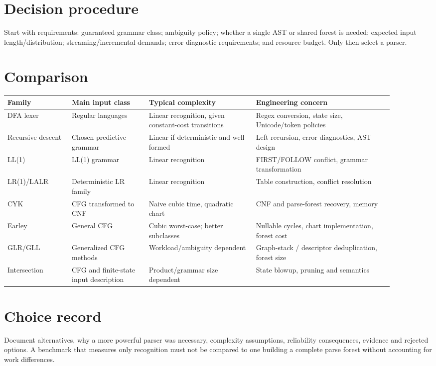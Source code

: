 \documentclass[11pt,letterpaper]{article}
\begin{document}
\makedoctitle\makedocsummary
\tableofcontents\clearpage

\section{Decision procedure}
Start with requirements: guaranteed grammar class; ambiguity policy; whether a single AST or shared forest is needed; expected input length/distribution; streaming/incremental demands; error diagnostic requirements; and resource budget. Only then select a parser.
\section{Comparison}\small\begin{longtable}{@{}>{\raggedright\arraybackslash}p{0.15\linewidth}>{\raggedright\arraybackslash}p{0.18\linewidth}>{\raggedright\arraybackslash}p{0.25\linewidth}>{\raggedright\arraybackslash}p{0.32\linewidth}@{}}\toprule Family & Main input class & Typical complexity & Engineering concern\\\midrule\endhead
DFA lexer & Regular languages & Linear recognition, given constant-cost transitions & Regex conversion, state size, Unicode/token policies\\
Recursive descent & Chosen predictive grammar & Linear if deterministic and well formed & Left recursion, error diagnostics, AST design\\
LL(1) & LL(1) grammar & Linear recognition & FIRST/FOLLOW conflict, grammar transformation\\
LR(1)/LALR & Deterministic LR family & Linear recognition & Table construction, conflict resolution\\
CYK & CFG transformed to CNF & Naive cubic time, quadratic chart & CNF and parse-forest recovery, memory\\
Earley & General CFG & Cubic worst-case; better subclasses & Nullable cycles, chart implementation, forest cost\\
GLR/GLL & Generalized CFG methods & Workload/ambiguity dependent & Graph-stack / descriptor deduplication, forest size\\
Intersection & CFG and finite-state input description & Product/grammar size dependent & State blowup, pruning and semantics\\
\bottomrule\end{longtable}\normalsize
\section{Choice record}
Document alternatives, why a more powerful parser was necessary, complexity assumptions, reliability consequences, evidence and rejected options. A benchmark that measures only recognition must not be compared to one building a complete parse forest without accounting for work differences.
\end{document}

